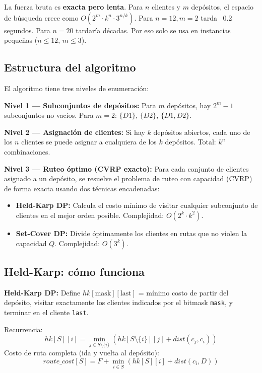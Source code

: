 \documentclass[12pt,a4paper]{article}
\begin{document}
\begin{nota}
La fuerza bruta es \textbf{exacta pero lenta}. Para $n$ clientes y $m$ depósitos, el espacio de búsqueda crece como $O(2^m \cdot k^n \cdot 3^{n/k})$. Para $n=12, m=2$ tarda ~0.2 segundos. Para $n=20$ tardaría décadas. Por eso solo se usa en instancias pequeñas ($n \leq 12$, $m \leq 3$).
\end{nota}

\subsection{Estructura del algoritmo}

El algoritmo tiene tres niveles de enumeración:

\textbf{Nivel 1 --- Subconjuntos de depósitos:} Para $m$ depósitos, hay $2^m - 1$ subconjuntos no vacíos. Para $m=2$: $\{D1\}$, $\{D2\}$, $\{D1, D2\}$.

\textbf{Nivel 2 --- Asignación de clientes:} Si hay $k$ depósitos abiertos, cada uno de los $n$ clientes se puede asignar a cualquiera de los $k$ depósitos. Total: $k^n$ combinaciones.

\textbf{Nivel 3 --- Ruteo óptimo (CVRP exacto):} Para cada conjunto de clientes asignado a un depósito, se resuelve el problema de ruteo con capacidad (CVRP) de forma exacta usando dos técnicas encadenadas:
\begin{itemize}
\item \textbf{Held-Karp DP:} Calcula el costo mínimo de visitar cualquier subconjunto de clientes en el mejor orden posible. Complejidad: $O(2^k \cdot k^2)$.
\item \textbf{Set-Cover DP:} Divide óptimamente los clientes en rutas que no violen la capacidad $Q$. Complejidad: $O(3^k)$.
\end{itemize}

\subsection{Held-Karp: cómo funciona}

\begin{definicion}
\textbf{Held-Karp DP:} Define $hk[\text{mask}][\text{last}]$ = mínimo costo de partir del depósito, visitar exactamente los clientes indicados por el bitmask \texttt{mask}, y terminar en el cliente \texttt{last}.

Recurrencia:
$$hk[S][i] = \min_{j \in S \setminus \{i\}} \left( hk[S \setminus \{i\}][j] + dist(c_j, c_i) \right)$$
Costo de ruta completa (ida y vuelta al depósito):
$$route\_cost[S] = F + \min_{i \in S} \left( hk[S][i] + dist(c_i, D) \right)$$
\end{definicion}
\end{document}
